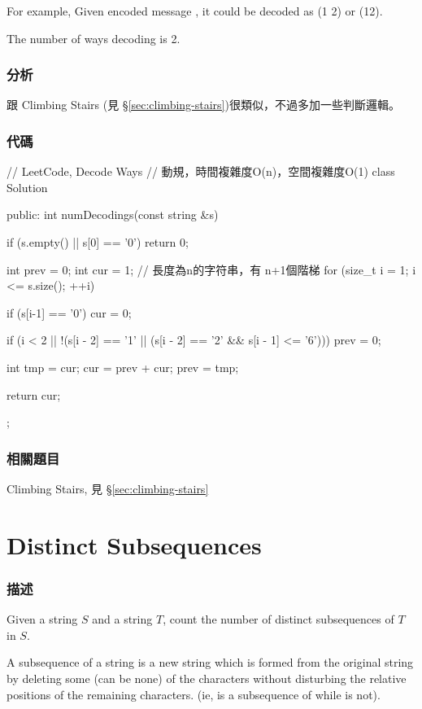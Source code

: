 For example,
Given encoded message , it could be decoded as  (1 2) or  (12).

The number of ways decoding  is 2.


\subsubsection{分析}
跟 Climbing Stairs (見 \S \ref{sec:climbing-stairs})很類似，不過多加一些判斷邏輯。


\subsubsection{代碼}
\begin{Code}
// LeetCode, Decode Ways
// 動規，時間複雜度O(n)，空間複雜度O(1)
class Solution {
public:
    int numDecodings(const string &s) {
        if (s.empty() || s[0] == '0') return 0;

        int prev = 0;
        int cur = 1;
        // 長度為n的字符串，有 n+1個階梯
        for (size_t i = 1; i <= s.size(); ++i) {
            if (s[i-1] == '0') cur = 0;

            if (i < 2 || !(s[i - 2] == '1' ||
                     (s[i - 2] == '2' && s[i - 1] <= '6')))
                prev = 0;

            int tmp = cur;
            cur = prev + cur;
            prev = tmp;
        }
        return cur;
    }
};
\end{Code}


\subsubsection{相關題目}
\begindot
\item Climbing Stairs, 見 \S \ref{sec:climbing-stairs}
\myenddot


\section{Distinct Subsequences} %
\label{sec:distinct-subsequences}


\subsubsection{描述}
Given a string $S$ and a string $T$, count the number of distinct subsequences of $T$ in $S$.

A subsequence of a string is a new string which is formed from the original string by deleting some (can be none) of the characters without disturbing the relative positions of the remaining characters. (ie,  is a subsequence of  while  is not).

